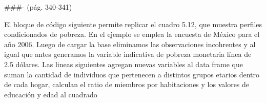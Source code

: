 \documentclass[
]{book}
\newenvironment{Shaded}{\begin{snugshade}}{\end{snugshade}}
\newcommand{\AttributeTok}[1]{\textcolor[rgb]{0.77,0.63,0.00}{#1}}
\newcommand{\CommentTok}[1]{\textcolor[rgb]{0.56,0.35,0.01}{\textit{#1}}}
\newcommand{\DecValTok}[1]{\textcolor[rgb]{0.00,0.00,0.81}{#1}}
\newcommand{\FloatTok}[1]{\textcolor[rgb]{0.00,0.00,0.81}{#1}}
\newcommand{\FunctionTok}[1]{\textcolor[rgb]{0.00,0.00,0.00}{#1}}
\newcommand{\NormalTok}[1]{#1}
\newcommand{\OtherTok}[1]{\textcolor[rgb]{0.56,0.35,0.01}{#1}}
\newcommand{\SpecialCharTok}[1]{\textcolor[rgb]{0.00,0.00,0.00}{#1}}
\newcommand{\StringTok}[1]{\textcolor[rgb]{0.31,0.60,0.02}{#1}}
\begin{document}
\#\#\#- (pág. 340-341)

El bloque de código siguiente permite replicar el cuadro 5.12, que muestra perfiles condicionados de pobreza. En el ejemplo se emplea la encuesta de México para el año 2006.
Luego de cargar la base eliminamos las observaciones incohrentes y al igual que antes generamos la variable indicativa de pobreza monetaria línea de 2.5 dólares. Las lineas siguientes agregan nuevas variables al data frame que suman la cantidad de individuos que pertenecen a distintos grupos etarios dentro de cada hogar, calculan el ratio de miembros por habitaciones y los valores de educación y edad al cuadrado

\begin{Shaded}
\end{Shaded}
\end{document}
